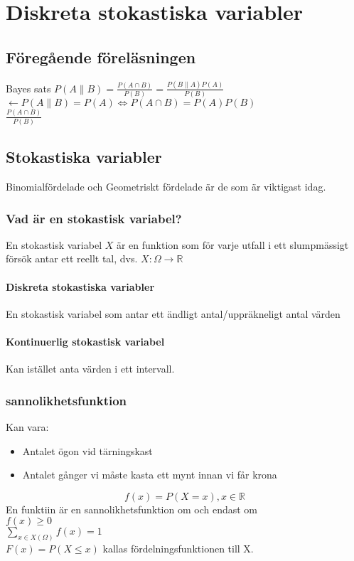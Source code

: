 \chapter{Diskreta stokastiska variabler}

\section{Föregående föreläsningen}
Bayes sats
$P(A\|B)=\frac{P(A\cap B)}{P(B)}=\frac{P(B\|A)P(A)}{P(B)}$
\\
$\leftarrow P(A\|B)=P(A)\Leftrightarrow P(A\cap B)=P(A)P(B)$\\
$\frac{P(A\cap B)}{P(B)}$

\section{Stokastiska variabler}
Binomialfördelade och Geometriskt fördelade är de som är viktigast idag.\\
\subsection{Vad är en stokastisk variabel?}
En stokastisk variabel $X$ är en funktion som för varje utfall i ett slumpmässigt försök antar ett reellt tal, dvs. $X:\Omega\rightarrow\mathbb{R}$
\\
\subsubsection{Diskreta stokastiska variabler}
En stokastisk variabel som antar ett ändligt antal/uppräkneligt antal värden
\subsubsection{Kontinuerlig stokastisk variabel}
Kan istället anta värden i ett intervall.
\subsection{sannolikhetsfunktion}
Kan vara:
\begin{itemize}
\item Antalet ögon vid tärningskast
\item Antalet gånger vi måste kasta ett mynt innan vi får krona
\end{itemize}

$$f(x)=P(X =x),x\in\mathbb{R}$$
En funktiin är en sannolikhetsfunktion om och endast om\\
$f(x)\geq0$
\\
$\sum_{x\in X(\Omega)}f(x)=1$\\
$F(x)=P(X\leq x)$ kallas fördelningsfunktionen till X.


